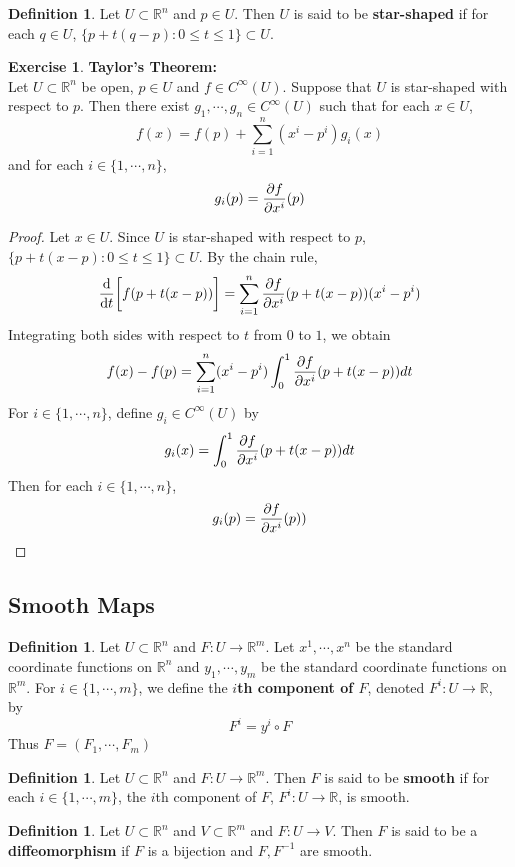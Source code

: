 \documentclass[12pt]{amsart}
\theoremstyle{definition}
\newtheorem{defn}[definition]{Definition}
\newtheorem{ex}[definition]{Exercise}
\newcommand{\R}{\mathbb{R}}
\begin{document}
	\begin{defn} 
		Let $U \subset \R^n$ and $p \in U$. Then $U$ is said to be \textbf{star-shaped} if for each $q \in U$, $\{p + t(q-p): 0 \leq t \leq 1\} \subset U$.
	\end{defn}

	\begin{ex} \textbf{Taylor's Theorem:}\\
		Let $U \subset \R^n$ be open, $p \in U$ and $f \in C^{\infty}(U)$. Suppose that $U$ is star-shaped with respect to $p$. Then there exist $g_1, \cdots, g_n \in C^{\infty}(U)$ such that for each $x \in U$, $$f(x) = f(p) + \sum_{i=1}^n (x^i - p^i) g_i(x)$$ and for each $i \in \{1, \cdots, n\}$, $$g_i(p) = {\pdv{f}{x^i}}(p)$$
	\end{ex}

	\begin{proof}
		Let $x \in U$. Since $U$ is star-shaped with respect to $p$, $\{p + t(x-p): 0 \leq t \leq 1\} \subset U$. By the chain rule, 
		$${\dv{t}} \bigg[ f(p+t(x-p)) \bigg] = \sum_{i=1}^n {\pdv{f}{x^i}}(p+t(x-p)) (x^i - p^i)$$
		Integrating both sides with respect to $t$ from $0$ to $1$, we obtain
		$$f(x) - f(p) = \sum_{i=1}^n (x^i - p^i) \int_{0}^{1}  {\pdv{f}{x^i}}(p+t(x-p)) dt $$
		For $i \in \{1, \cdots, n\}$, define $g_i \in C^{\infty}(U)$ by $$g_i(x) = \int_{0}^{1}  {\pdv{f}{x^i}}(p+t(x-p)) dt$$
		Then for each $i \in \{1, \cdots, n\}$, $$g_i(p) = {\pdv{f}{x^i}}(p))$$
	\end{proof}

	
	\subsection{Smooth Maps}
	\begin{defn}
	Let $U \subset \R^n$ and $F: U \rightarrow \R^m$. Let $x^1, \cdots, x^n$ be the standard coordinate functions on $\R^n$ and $y_1, \cdots, y_m$ be the standard coordinate functions on $\R^m$. For $i \in \{1, \cdots, m\}$, we define the \textbf{$i$th component of $F$}, denoted $F^i: U \rightarrow \R$, by $$F^i = y^i \circ F$$ 
	Thus $F = (F_1, \cdots, F_m)$
	\end{defn}
	
	\begin{defn}
	Let $U \subset \R^n$ and $F: U \rightarrow \R^m$. Then $F$ is said to be \textbf{smooth} if for each $i \in \{1, \cdots, m\}$, the $i$th component of $F$, $F^i: U \rightarrow \R$, is smooth.
	\end{defn}

	\begin{defn}
		Let $U \subset \R^n$ and $V \subset \R^m$ and $F: U \rightarrow V$. Then $F$ is said to be a  \textbf{diffeomorphism} if $F$ is a bijection and $F, F^{-1}$ are smooth. 
	\end{defn}
	
\end{document}

